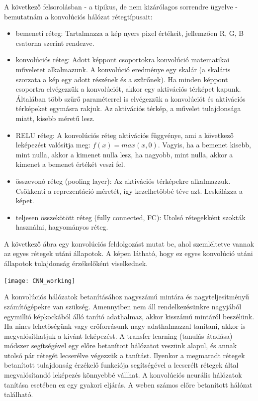 A következő felsorolásban - a tipikus, de nem kizárólagos sorrendre ügyelve - bemutatnám a konvolúciós hálózat rétegtípusait:
\begin{itemize}
\item bemeneti réteg: Tartalmazza a kép nyers pixel értékeit, jellemzően R, G, B csatorna szerint rendezve.
\item konvolúciós réteg: Adott képpont csoportokra konvolúció matematikai műveletet alkalmazunk. A konvolúció eredménye egy skalár (a skaláris szorzata a kép egy adott részének és a szűrőnek). Ha minden képpont csoportra elvégezzük a konvolúciót, akkor egy aktivációs térképet kapunk. Általában több szűrő paraméterrel is elvégezzük a konvolúciót és aktivációs térképeket egymásra rakjuk. Az aktivációs térkép, a művelet tulajdonsága miatt, kisebb
méretű lesz.
\item RELU réteg: A konvolúciós réteg aktivációs függvénye, ami a következő leképezést valósítja meg: \(f(x) = max(x, 0)\). Vagyis, ha a bemenet kisebb, mint nulla, akkor a kimenet nulla lesz, ha nagyobb, mint nulla, akkor a kimenet a bemenet értékét veszi fel.
\item összevonó réteg (pooling layer): Az aktivációs térképekre alkalmazzuk. Csökkenti a reprezentáció méretét, így kezelhetőbbé téve azt. Leskálázza a képet.
\item teljesen összekötött réteg (fully connected, FC): Utolsó rétegekként szokták használni, hagyományos réteg. 
\end{itemize}

A következő ábra egy konvolúciós feldolgozást mutat be, ahol szemléltetve vannak az egyes rétegek utáni állapotok. A képen látható, hogy ez egyes konvolúció utáni állapotok tulajdonság érzékelőként viselkednek.

\begin{center}
\texttt{[image: CNN\_working]}
\end{center}

A konvolúciós hálózatok betanításához nagyszámú mintára és nagyteljesítményű számítógépekre van szükség. Amennyiben nem áll rendelkezésünkre nagyjából egymillió képkockából álló tanító adathalmaz, akkor kisszámú mintáról beszélünk. Ha nincs lehetőségünk vagy erőforrásunk nagy adathalmazzal tanítani, akkor is megvalósíthatjuk a kívánt leképezést. A transfer learning (tanulás átadása) módszer segítségével egy előre betanított hálózatot veszünk alapul, és annak utolsó pár rétegét lecserélve végezzük a tanítást. Ilyenkor a megmaradt rétegek betanított tulajdonság érzékelő funkciója segítségével a lecserélt rétegek által megvalósítandó leképezés könnyebbé vállhat. A konvolúciós neurális hálózatok tanítása esetében ez egy gyakori eljárás. A weben számos előre betanított hálózat található.